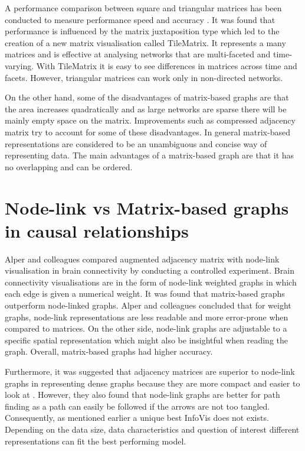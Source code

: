 \documentclass{l4proj}
\begin{document}
A performance comparison between square and triangular matrices has been conducted to measure performance speed and accuracy \cite{liu2015effects}. It was found that performance is influenced by the matrix juxtaposition type which led to the creation of a new matrix visualisation called TileMatrix. It represents a many matrices and is effective at analysing networks that are multi-faceted and time-varying. With TileMatrix it is easy to see differences in matrices across time and facets. However, triangular matrices can work only in non-directed networks. 

On the other hand, some of the disadvantages of matrix-based graphs are that the area increases quadratically and as large networks are sparse there will be mainly empty space on the matrix. Improvements such as compressed adjacency matrix try to account for some of these disadvantages. In general matrix-based representations are considered to be an unambiguous and concise way of representing data. The main advantages of a matrix-based graph are that it has no overlapping and can be ordered.

\section{Node-link vs Matrix-based graphs in causal relationships}

Alper and colleagues \cite{alper2013weighted} compared augmented adjacency matrix with node-link visualisation in brain connectivity by conducting a controlled experiment. Brain connectivity visualisations are in the form of node-link weighted graphs in which each edge is given a numerical weight. It was found that matrix-based graphs outperform node-linked graphs. Alper and colleagues concluded that for weight graphs, node-link representations are less readable and more error-prone when compared to matrices. On the other side, node-link graphs are adjustable to a specific spatial representation which might also be insightful when reading the graph. Overall, matrix-based graphs had higher accuracy.  

Furthermore, it was suggested that adjacency matrices are superior to node-link graphs in representing dense graphs because they are more compact and easier to look at \cite{sheny2007path}. However, they also found that node-link graphs are better for path finding as a path can easily be followed if the arrows are not too tangled. Consequently, as mentioned earlier a unique best InfoVis does not exists. Depending on the data size, data characteristics and question of interest different representations can fit the best performing model. 
\end{document}
